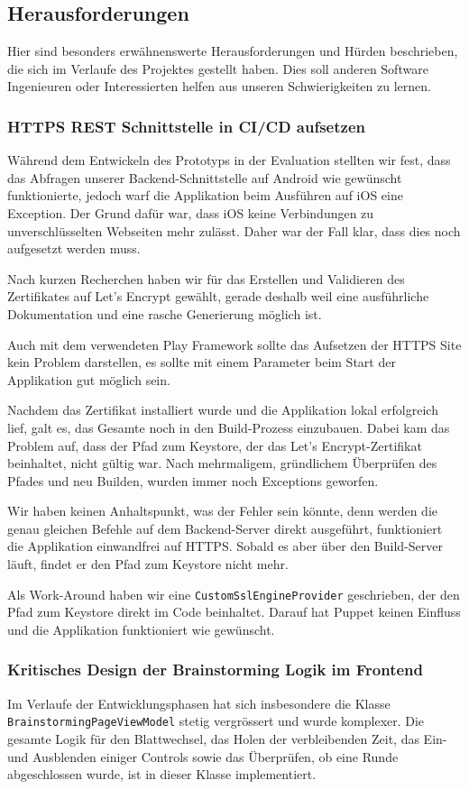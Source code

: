 \subsection{Herausforderungen}
Hier sind besonders erwähnenswerte Herausforderungen und Hürden beschrieben, die sich im Verlaufe des Projektes gestellt haben. Dies soll anderen Software Ingenieuren oder Interessierten helfen  aus unseren Schwierigkeiten zu lernen. 

\subsubsection{HTTPS REST Schnittstelle in CI/CD aufsetzen}
Während dem Entwickeln des Prototyps in der Evaluation stellten wir fest, dass das Abfragen unserer Backend-Schnittstelle auf Android wie gewünscht funktionierte, jedoch warf die Applikation beim Ausführen auf iOS eine Exception. Der Grund dafür war, dass iOS keine Verbindungen zu unverschlüsselten Webseiten mehr zulässt. Daher war der Fall klar, dass dies noch aufgesetzt werden muss.

Nach kurzen Recherchen haben wir für das Erstellen und Validieren des Zertifikates auf Let's Encrypt \cite{letsencrypt} gewählt, gerade deshalb weil eine ausführliche Dokumentation und eine rasche Generierung möglich ist. 

Auch mit dem verwendeten Play Framework sollte das Aufsetzen der HTTPS Site kein Problem darstellen, es sollte mit einem Parameter beim Start der Applikation gut möglich sein. 

Nachdem das Zertifikat installiert wurde und die Applikation lokal erfolgreich lief, galt es, das Gesamte noch in den Build-Prozess einzubauen. Dabei kam das Problem auf, dass der Pfad zum Keystore, der das Let's Encrypt-Zertifikat beinhaltet, nicht gültig war. Nach mehrmaligem, gründlichem Überprüfen des Pfades und neu Builden, wurden immer noch Exceptions geworfen.

Wir haben keinen Anhaltspunkt, was der Fehler sein könnte, denn werden die genau gleichen Befehle auf dem Backend-Server direkt ausgeführt, funktioniert die Applikation einwandfrei auf HTTPS. Sobald es aber über den Build-Server läuft, findet er den Pfad zum Keystore nicht mehr.

Als Work-Around haben wir eine \texttt{CustomSslEngineProvider} geschrieben, der den Pfad zum Keystore direkt im Code beinhaltet. Darauf hat Puppet keinen Einfluss und die Applikation funktioniert wie gewünscht.

\subsubsection{Kritisches Design der Brainstorming Logik im Frontend}
Im Verlaufe der Entwicklungsphasen hat sich insbesondere die Klasse \texttt{Brain\-storming\-PageViewModel} stetig vergrössert und wurde komplexer. Die gesamte Logik für den Blattwechsel, das Holen der verbleibenden Zeit, das Ein- und Ausblenden einiger Controls sowie das Überprüfen, ob eine Runde abgeschlossen wurde, ist in dieser Klasse implementiert. 


